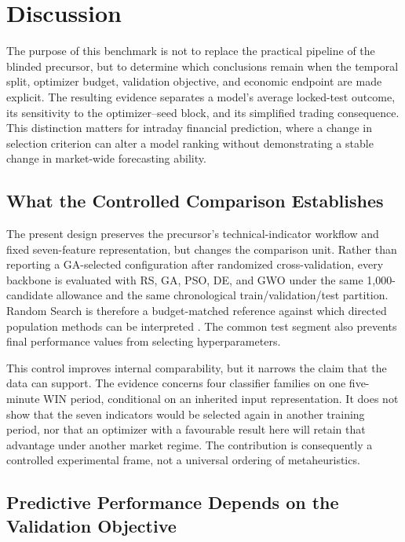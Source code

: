 \section{Discussion}\label{sec:discussion}

The purpose of this benchmark is not to replace the practical pipeline of the blinded precursor, but to determine which conclusions remain when the temporal split, optimizer budget, validation objective, and economic endpoint are made explicit. The resulting evidence separates a model's average locked-test outcome, its sensitivity to the optimizer--seed block, and its simplified trading consequence. This distinction matters for intraday financial prediction, where a change in selection criterion can alter a model ranking without demonstrating a stable change in market-wide forecasting ability.

\subsection{What the Controlled Comparison Establishes}

The present design preserves the precursor's technical-indicator workflow and fixed seven-feature representation, but changes the comparison unit. Rather than reporting a GA-selected configuration after randomized cross-validation, every backbone is evaluated with RS, GA, PSO, DE, and GWO under the same 1,000-candidate allowance and the same chronological train/validation/test partition. Random Search is therefore a budget-matched reference against which directed population methods can be interpreted \cite{bergstra2012random_search}. The common test segment also prevents final performance values from selecting hyperparameters.

This control improves internal comparability, but it narrows the claim that the data can support. The evidence concerns four classifier families on one five-minute WIN period, conditional on an inherited input representation. It does not show that the seven indicators would be selected again in another training period, nor that an optimizer with a favourable result here will retain that advantage under another market regime. The contribution is consequently a controlled experimental frame, not a universal ordering of metaheuristics.

\subsection{Predictive Performance Depends on the Validation Objective}

